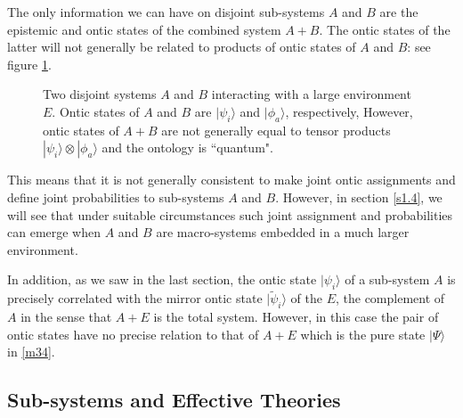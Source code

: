 \documentclass[%
preprint,
nofootinbib,
 amsmath,amssymb,
aps,
]{revtex4-1}
\def\ket#1{| #1\rangle}
\begin{document}
The only information we can have on disjoint sub-systems $A$ and $B$ are the epistemic and ontic states of the combined system $A+B$. The ontic states of the latter will not generally be related to products of ontic states of $A$ and $B$: see figure \ref{f2}. 
\begin{figure}[ht]
\begin{center}
\end{center}
\caption{\small Two disjoint systems $A$ and $B$ interacting with a large environment $E$. Ontic states of $A$ and $B$ are $\ket{\psi_i}$ and $\ket{\phi_a}$, respectively, However, ontic states of $A+B$ are not generally equal to tensor products $\ket{\psi_i}\otimes\ket{\phi_a}$ and the ontology is ``quantum".}
\label{f2}
\end{figure}
This means that it is not generally consistent to make joint ontic assignments and define joint probabilities to sub-systems $A$ and $B$. However, in section \ref{s1.4}, we will see that under suitable circumstances such joint assignment and probabilities can emerge when $A$ and $B$ are macro-systems embedded in a much larger environment.

In addition, as we saw in the last section, the ontic state $\ket{\psi_i}$ of a sub-system $A$  is precisely correlated with the mirror ontic state $\ket{\tilde\psi_i}$ of the $E$, the complement of $A$ in the sense that $A+E$ is the total system. However, in this case the pair of ontic states have no precise relation to that of $A+E$ which is the pure state $\ket{\Psi}$ in \eqref{m34}.

\subsection{Sub-systems and Effective Theories}\label{s1.2}
\end{document}
